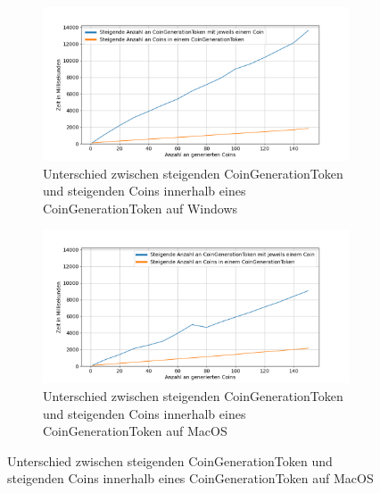 \documentclass[
	fontsize=11pt,
	headings=small,
	parskip=half,           %
	bibliography=totoc,
	numbers=noenddot,       %
	open=any,               %
]{scrreprt}
\begin{document}
\begin{figure}[h]
    \centering
    \begin{subfigure}[b]{0.49\textwidth}
        \includegraphics[width=1\textwidth]{figure_win_coins.png}
        \caption{Unterschied zwischen steigenden CoinGenerationToken und steigenden Coins innerhalb eines CoinGenerationToken auf Windows}
        \label{fig:win_coins}
    \end{subfigure}
    \hfill
    \begin{subfigure}[b]{0.49\textwidth}
        \includegraphics[width=1\textwidth]{figure_mac_coins.png}  
        \caption{Unterschied zwischen steigenden CoinGenerationToken und steigenden Coins innerhalb eines CoinGenerationToken auf MacOS}
        \label{fig:mac_coins}
    \end{subfigure}
\end{figure}
\end{document}

